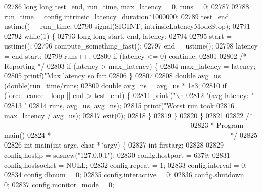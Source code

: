\begin{DoxyCode}
{{{{{{{{{{{{{{{{{{{{{{{{{{{{{{{{{{{{{{{{{{{{{{{{{{{{{{{{{{{{{{{{{{{{{{{{{{{{{{{{{{{{{{{{{{{{{{{{{{{{{{{{{{{{{{{{02786     \textcolor{keywordtype}{long} \textcolor{keywordtype}{long} test\_end, run\_time, max\_latency = 0, runs = 0;
02787 
02788     run\_time = config.intrinsic\_latency\_duration*1000000;
02789     test\_end = ustime() + run\_time;
02790     signal(SIGINT, intrinsicLatencyModeStop);
02791 
02792     \textcolor{keywordflow}{while}(1) \{
02793         \textcolor{keywordtype}{long} \textcolor{keywordtype}{long} start, end, latency;
02794 
02795         start = ustime();
02796         compute\_something\_fast();
02797         end = ustime();
02798         latency = end-start;
02799         runs++;
02800         \textcolor{keywordflow}{if} (latency <= 0) \textcolor{keywordflow}{continue};
02801 
02802         \textcolor{comment}{/* Reporting */}
02803         \textcolor{keywordflow}{if} (latency > max\_latency) \{
02804             max\_latency = latency;
02805             printf(\textcolor{stringliteral}{"Max latency so far: %
02806         \}
02807 
02808         \textcolor{keywordtype}{double} avg\_us = (\textcolor{keywordtype}{double})run\_time/runs;
02809         \textcolor{keywordtype}{double} avg\_ns = avg\_us * 1e3;
02810         \textcolor{keywordflow}{if} (force\_cancel\_loop || end > test\_end) \{
02811             printf(\textcolor{stringliteral}{"\(\backslash\)n%
02812                 \textcolor{stringliteral}{"(avg latency: "}
02813                 \textcolor{stringliteral}{"%
02814                 runs, avg\_us, avg\_ns);
02815             printf(\textcolor{stringliteral}{"Worst run took %
02816                 max\_latency / avg\_us);
02817             exit(0);
02818         \}
02819     \}
02820 \}
02821 
02822 \textcolor{comment}{/*------------------------------------------------------------------------------}
02823 \textcolor{comment}{ * Program main()}
02824 \textcolor{comment}{ *--------------------------------------------------------------------------- */}
02825 
02826 \textcolor{keywordtype}{int} main(\textcolor{keywordtype}{int} argc, \textcolor{keywordtype}{char} **argv) \{
02827     \textcolor{keywordtype}{int} firstarg;
02828 
02829     config.hostip = sdsnew(\textcolor{stringliteral}{"127.0.0.1"});
02830     config.hostport = 6379;
02831     config.hostsocket = NULL;
02832     config.repeat = 1;
02833     config.interval = 0;
02834     config.dbnum = 0;
02835     config.interactive = 0;
02836     config.shutdown = 0;
02837     config.monitor\_mode = 0;
}}}}}}}}}}}}}}}}}}}}}}}}}}}}}}}}}}}}}}}}}}}}}}}}}}}}}}}}}}}}}}}}}}}}}}}}}}}}}}}}}}}}}}}}}}}}}}}}}}}}}}}}}}}}}}}}}}}}
\end{DoxyCode}
